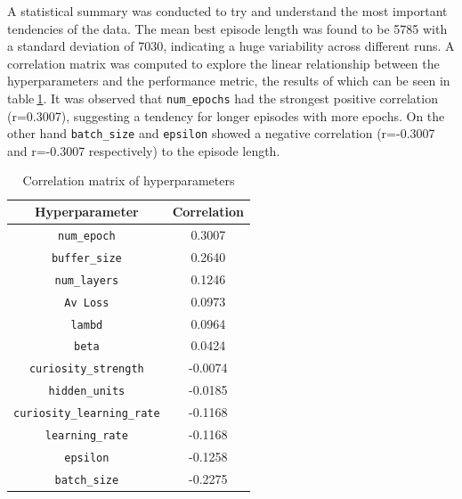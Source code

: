 A statistical summary was conducted to try and understand the most important tendencies of the data. The mean best episode length was found to be 5785 with a standard deviation of 7030, indicating a huge variability across different runs. A correlation matrix was computed to explore the linear relationship between the hyperparameters and the performance metric, the results of which can be seen in table$~$\ref{corr_matrix}. It was observed that \texttt{num\_epochs} had the strongest positive correlation (r=0.3007), suggesting a tendency for longer episodes with more epochs. On the other hand \texttt{batch\_size} and \texttt{epsilon} showed a negative correlation (r=-0.3007 and r=-0.3007 respectively) to the episode length.

\begin{table}[!htb]
    \centering
    \begin{tabular}{c|c}
        \textbf{Hyperparameter} & \textbf{Correlation} \\
        \hline

        \texttt{num\_epoch} & 0.3007 \\
        \texttt{buffer\_size} & 0.2640 \\
        \texttt{num\_layers} & 0.1246 \\
        \texttt{Av Loss} & 0.0973 \\
        \texttt{lambd} & 0.0964 \\
        \texttt{beta} & 0.0424 \\
        \texttt{curiosity\_strength} & -0.0074 \\
        \texttt{hidden\_units} & -0.0185 \\
        \texttt{curiosity\_learning\_rate} & -0.1168 \\
        \texttt{learning\_rate} & -0.1168 \\
        \texttt{epsilon} & -0.1258 \\
        \texttt{batch\_size} & -0.2275 \\
        \bottomrule
    \end{tabular}
    \caption{Correlation matrix of hyperparameters}\label{corr_matrix}
\end{table}


